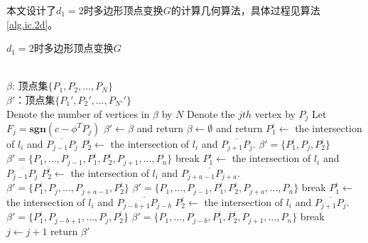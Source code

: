 本文设计了$d_{1}=2$时多边形顶点变换$G$的计算几何算法，具体过程见算法\ref{alg.ic.2d}。

\begin{algo}%
\caption{$d_{1}=2$时多边形顶点变换$G$}
\label{alg.ic.2d}
\begin{algorithmic}
\REQUIRE\\
$\beta$: 顶点集$\{P_{1},P_{2},\ldots,P_{N}\}$\\
\ENSURE
$\beta'$：顶点集$\{P_{1}',P_{2}',\ldots,P_{N'}'\}$\\
\STATE Denote the number of vertices in $\beta$ by $N$
	\STATE Denote the $jth$ vertex by $P_{j}$
	\STATE Let $F_{j}=\mathbf{sgn}(c-\phi^{T}P_{j})$
\ENDFOR
{}
	\STATE $\beta'\leftarrow\beta$ and return
	\STATE $\beta\leftarrow\emptyset$ and return
\ENDIF
{}
		\STATE $P_{1}^{i}\leftarrow$ the intersection of $l_{i}$ and $\overline{P_{j-1}P_{j}}$
		\STATE $P_{2}^{i}\leftarrow$ the intersection of $l_{i}$ and $\overline{P_{j+1}P_{j}}$.
			\STATE$\beta'=\{P_{1}^{i},P_{j},P_{2}^{i}\}$
		\ELSE
			\STATE$\beta'=\{P_{1},\ldots,P_{j-1},P_{1}^{i},P_{2}^{i},P_{j+1},\ldots,P_{n}\}$
		\ENDIF
        \STATE break
		\STATE $P_{1}^{i}\leftarrow$ the intersection of $l_{i}$ and $\overline{P_{j-1}P_{j}}$
		\STATE $P_{2}^{i}\leftarrow$ the intersection of $l_{i}$ and $\overline{P_{j+a-1}P_{j+a}}$.
			\STATE$\beta'=\{P_{1}^{i},P_{j},\ldots,P_{j+a-1},P_{2}^{i}\}$
		\ELSE
			\STATE$\beta'=\{P_{1},\ldots,P_{j-1},P_{1}^{i},P_{2}^{i},P_{j+a},\ldots,P_{n}\}$
		\ENDIF
        \STATE break
		\STATE $P_{1}^{i}\leftarrow$ the intersection of $l_{i}$ and $\overline{P_{j-b+1}P_{j-b}}$
		\STATE $P_{2}^{i}\leftarrow$ the intersection of $l_{i}$ and $\overline{P_{j+1}P_{j}}$.
			\STATE$\beta'=\{P_{1}^{i},P_{j-b+1},\ldots,P_{j},P_{2}^{i}\}$
		\ELSE
			\STATE$\beta'=\{P_{1},\ldots,P_{j-b},P_{1}^{i},P_{2}^{i},P_{j+1},\ldots,P_{n}\}$
		\ENDIF
        \STATE break
    \ENDIF
	\STATE $j\leftarrow j+1$
\ENDFOR
\STATE return $\beta'$
\end{algorithmic}
\end{algo}
